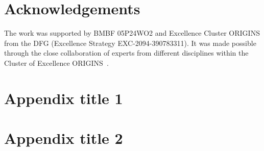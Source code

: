 \documentclass[final,5p,times,twocolumn]{elsarticle}
\begin{document}
\section*{Acknowledgements}
The work was supported by BMBF 05P24WO2 and Excellence Cluster ORIGINS from the DFG (Excellence Strategy EXC-2094-390783311). It was made possible through the close collaboration of experts from different disciplines within the Cluster of Excellence ORIGINS~\cite{origins2025}.

\appendix

\section{Appendix title 1}

\section{Appendix title 2}

 







\end{document}
